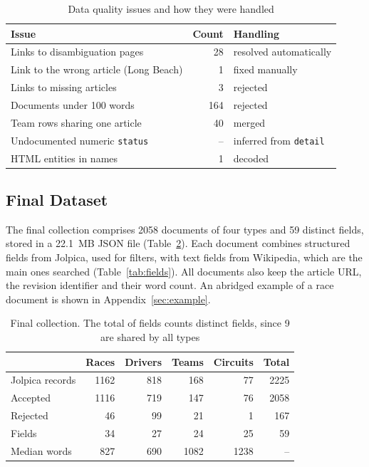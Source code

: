 \documentclass[sigconf]{acmart}
\begin{document}
\begin{table}[ht]
  \small
  \begin{tabular}{p{3.6cm}rp{2.8cm}}
    \toprule
    Issue & Count & Handling \\
    \midrule
    Links to disambiguation pages & 28 & resolved automatically \\
    Link to the wrong article (Long Beach) & 1 & fixed manually \\
    Links to missing articles & 3 & rejected \\
    Documents under 100 words & 164 & rejected \\
    Team rows sharing one article & 40 & merged \\
    Undocumented numeric \texttt{status} & -- & inferred from \texttt{detail} \\
    HTML entities in names & 1 & decoded \\
    \bottomrule
  \end{tabular}
  \caption{Data quality issues and how they were handled}
  \label{tab:quality}
\end{table}

\subsection{Final Dataset}
\label{sec:final}
The final collection comprises 2058 documents of four types and 59 distinct
fields, stored in a 22.1~MB JSON file (Table~\ref{tab:collection}). Each document combines structured fields from
Jolpica, used for filters, with text fields from Wikipedia, which are the
main ones searched (Table~\ref{tab:fields}). All documents also keep the article
URL, the revision identifier and their word count. An abridged example of a race
document is shown in Appendix~\ref{sec:example}.

\begin{table}[ht]
  \small
  \begin{tabular}{lrrrrr}
    \toprule
     & Races & Drivers & Teams & Circuits & Total \\
    \midrule
    Jolpica records & 1162 & 818 & 168 & 77 & 2225 \\
    Accepted & 1116 & 719 & 147 & 76 & 2058 \\
    Rejected & 46 & 99 & 21 & 1 & 167 \\
    Fields & 34 & 27 & 24 & 25 & 59 \\
    Median words & 827 & 690 & 1082 & 1238 & -- \\
    \bottomrule
  \end{tabular}
  \caption{Final collection. The total of fields counts distinct fields, since 9 are shared by all types}
  \label{tab:collection}
\end{table}
\end{document}
